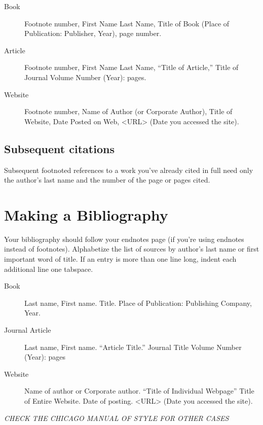 \documentclass[oneside]{article}
\begin{document}
\begin{description}
\item[Book] Footnote number, First Name Last Name, Title of Book (Place of
Publication: Publisher, Year), page number.


\item[Article] Footnote number, First Name Last Name, ``Title of Article,'' Title of
Journal Volume Number (Year): pages.



\item[Website] Footnote number, Name of Author (or Corporate Author), Title of
Website, Date Posted on Web, <URL> (Date you accessed the site).

\end{description}

\subsection{Subsequent citations}
Subsequent footnoted references to a work you've already cited in full need only the author's last name and the number of the page or pages cited.

\section{Making a Bibliography}
Your bibliography should follow your endnotes page (if you're using endnotes instead of footnotes). Alphabetize the list of sources by author's last name or first important word of title. If an entry is more than one line long, indent each additional line one tabspace.

\begin{description}
\item[Book] Last name, First name. Title. Place of Publication: Publishing Company, Year.
\item[Journal Article] Last name, First name. ``Article Title.'' Journal Title Volume Number (Year): pages
\item[Website] Name of author or Corporate author. ``Title of Individual Webpage'' Title of Entire Website. Date of posting. <URL> (Date you accessed the site).
\end{description}
\noindent \emph{CHECK THE CHICAGO MANUAL OF STYLE FOR OTHER CASES}
\end{document}
